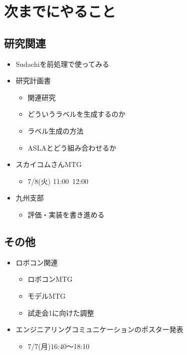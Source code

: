 \documentclass[uplatex, onecolumn, 10pt]{jsarticle}
\begin{document}
\section{次までにやること}

\subsection*{研究関連}
\begin{itemize}
	\iten 研究室でかPCの環境構築
	\item Sudachiを前処理で使ってみる
	\item 研究計画書
	\begin{itemize}
	\item 関連研究
	\item どういうラベルを生成するのか
	\item ラベル生成の方法
	\item ASLAとどう組み合わせるか
	\end{itemize}
	\item スカイコムさんMTG
	\begin{itemize}
	\item 7/8(火) 11:00~12:00
	\end{itemize}
	\item 九州支部
	\begin{itemize}
	\item 評価・実装を書き進める
	\end{itemize}
\end{itemize}

\subsection*{その他}
\begin{itemize}
    \item ロボコン関連
		\begin{itemize}
			\item ロボコンMTG
			\item モデルMTG
			\item 試走会1に向けた調整
		\end{itemize}
    \item エンジニアリングコミュニケーションのポスター発表
    \begin{itemize}
		\item 7/7(月)16:40〜18:10
	\end{itemize}
\end{itemize}
\end{document}
